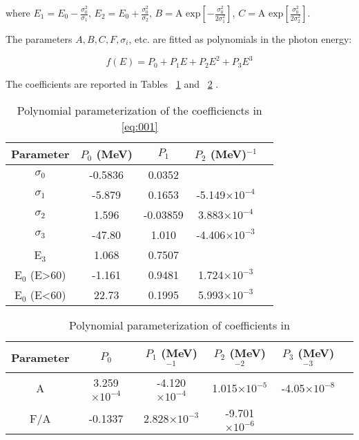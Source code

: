 where $E_1=E_0 - \frac{\sigma_0^2}{\sigma_1}$, $E_2 =E_0 + \frac{\sigma_0^2}{\sigma_2}$,
 $B=\text{A exp}\left[-\frac{\sigma_0^2}{2\sigma_1^2}\right]$, 
 $C=\text{A exp}\left[\frac{\sigma_0^2}{2\sigma_2^2}\right]$. 

 The parameters $A, B ,C , F, \sigma_i$, etc. are fitted as polynomials in the photon energy:
 
\begin{equation}
  f(E)= P_0+P_1E+P_2E^2+P_3E^3
\end{equation}

The coefficients are reported in Tables ~\ref{tab:coefficients1} and ~\ref{tab:coefficients2} .

\begin{table}[!h]
\begin{center}
\begin{tabular}{| c | c | c | c | c | }
\hline
Parameter & $P_0$ (MeV)& $P_1$ & $P_2$ (MeV)$^{-1}$ \\ \hline
$\sigma_0$ & -0.5836 & 0.0352 & \\ \hline
$\sigma_1$ & -5.879 & 0.1653 & -5.149$\times 10^{-4}$ \\ \hline
$\sigma_2$ & 1.596 & -0.03859 & 3.883$\times 10^{-4}$ \\ \hline
$\sigma_3$ & -47.80 & 1.010 & -4.406$\times 10^{-3}$ \\ \hline
E$_3$ & 1.068 & 0.7507 & \\ \hline
E$_0$ (E>60) & -1.161 & 0.9481 & 1.724$\times 10^{-3}$ \\ \hline
E$_0$ (E<60) & 22.73 & 0.1995 & 5.993$\times 10^{-3}$ \\ \hline

\end{tabular}
\end{center}
\caption{
  Polynomial parameterization of the coefficiencts in \ref{eq:001}
  \label{tab:coefficients1}}
\end{table}

\begin{table}[!h]
\begin{center}
\begin{tabular}{| c | c | c | c | c | c |}
\hline
Parameter & $P_0$ & $P_1$ (MeV)$^{-1}$ & $P_2$ (MeV)$^{-2}$  & $P_3$ (MeV)$^{-3}$\\ \hline
A & 3.259$\times 10^{-4}$ & -4.120$\times 10^{-4}$ & 1.015$\times 10^{-5}$ & -4.05$\times 10^{-8}$  \\ \hline
F/A & -0.1337 & 2.828$\times 10^{-3}$ & -9.701$\times 10^{-6}$ & \\ \hline
\end{tabular}
\end{center}
\caption{Polynomial parameterization of coefficients in \label{tab:coefficients2}}
\end{table}

